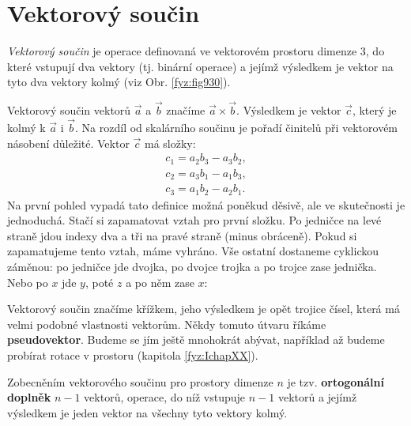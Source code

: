   \section{Vektorový součin} 
    \emph{Vektorový součin} je operace definovaná ve vektorovém prostoru dimenze 3, do které
    vstupují dva vektory (tj. binární operace) a jejímž výsledkem je vektor na tyto dva vektory
    kolmý (viz Obr. \ref{fyz:fig930}).


    Vektorový součin vektorů \(\vec{a}\) a \(\vec{b}\) značíme \(\vec{a}\times\vec{b}\). Výsledkem
    je vektor \(\vec{c}\), který je kolmý k \(\vec{a}\) i \(\vec{b}\). Na rozdíl od skalárního
    součinu je pořadí činitelů při vektorovém násobení důležité. Vektor \(\vec{c}\) má složky: 
    \begin{subequations}\label{fyz:eq752}
      \begin{align}
        c_1 =a_2b_3−a_3b_2,    \label{fyz:eq752a}  \\
        c_2 =a_3b_1−a_1b_3,    \label{fyz:eq752b}  \\
        c_3 =a_1b_2−a_2b_1.    \label{fyz:eq752c}
      \end{align}
    \end{subequations}
    Na první pohled vypadá tato definice možná poněkud děsivě, ale ve skutečnosti je jednoduchá.
    Stačí si zapamatovat vztah pro první složku. Po jedničce na levé straně jdou indexy dva a tři na
    pravé straně (minus obráceně). Pokud si zapamatujeme tento vztah, máme vyhráno. Vše ostatní
    dostaneme cyklickou záměnou: po jedničce jde dvojka, po dvojce trojka a po trojce zase jednička.
    Nebo po \(x\) jde \(y\), poté \(z\) a po něm zase \(x\): 


    Vektorový součin značíme křížkem, jeho výsledkem je opět trojice čísel, která má velmi podobné
    vlastnosti vektorům. Někdy tomuto útvaru říkáme \textbf{pseudovektor}. Budeme se jím ještě
    mnohokrát abývat, například až budeme probírat rotace v prostoru (kapitola \ref{fyz:IchapXX}).

    Zobecněním vektorového součinu pro prostory dimenze \(n\) je tzv. \textbf{ortogonální doplněk}
    \(n-1\) vektorů, operace, do níž vstupuje \(n − 1\) vektorů a jejímž výsledkem je jeden vektor
    na všechny tyto vektory kolmý.


